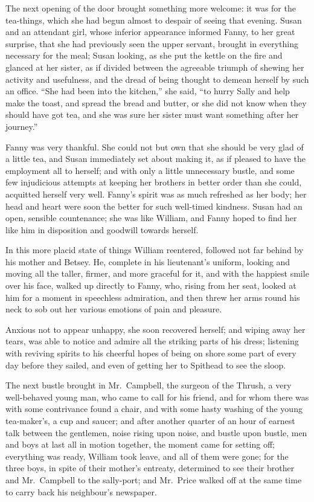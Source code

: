 \documentclass{article}
\begin{document}
The next opening of the door brought something more welcome:
it was for the tea-things, which she had begun almost
to despair of seeing that evening.  Susan and an
attendant girl, whose inferior appearance informed Fanny,
to her great surprise, that she had previously seen the
upper servant, brought in everything necessary for the meal;
Susan looking, as she put the kettle on the fire and glanced
at her sister, as if divided between the agreeable triumph
of shewing her activity and usefulness, and the dread
of being thought to demean herself by such an office.
``She had been into the kitchen,'' she said, ``to hurry Sally
and help make the toast, and spread the bread and butter,
or she did not know when they should have got tea,
and she was sure her sister must want something after
her journey.''

Fanny was very thankful.  She could not but own that she
should be very glad of a little tea, and Susan immediately
set about making it, as if pleased to have the employment
all to herself; and with only a little unnecessary bustle,
and some few injudicious attempts at keeping her brothers
in better order than she could, acquitted herself very well.
Fanny's spirit was as much refreshed as her body; her head
and heart were soon the better for such well-timed kindness.
Susan had an open, sensible countenance; she was like William,
and Fanny hoped to find her like him in disposition
and goodwill towards herself.

In this more placid state of things William reentered,
followed not far behind by his mother and Betsey.
He, complete in his lieutenant's uniform, looking and
moving all the taller, firmer, and more graceful for it,
and with the happiest smile over his face, walked up directly
to Fanny, who, rising from her seat, looked at him for a
moment in speechless admiration, and then threw her arms
round his neck to sob out her various emotions of pain and
pleasure.

Anxious not to appear unhappy, she soon recovered herself;
and wiping away her tears, was able to notice and admire
all the striking parts of his dress; listening with reviving
spirits to his cheerful hopes of being on shore some part
of every day before they sailed, and even of getting
her to Spithead to see the sloop.

The next bustle brought in Mr.\ Campbell, the surgeon
of the Thrush, a very well-behaved young man, who came
to call for his friend, and for whom there was with some
contrivance found a chair, and with some hasty washing of
the young tea-maker's, a cup and saucer; and after another
quarter of an hour of earnest talk between the gentlemen,
noise rising upon noise, and bustle upon bustle, men and
boys at last all in motion together, the moment came
for setting off; everything was ready, William took leave,
and all of them were gone; for the three boys, in spite
of their mother's entreaty, determined to see their brother
and Mr.\ Campbell to the sally-port; and Mr.\ Price walked
off at the same time to carry back his neighbour's newspaper.
\end{document}
